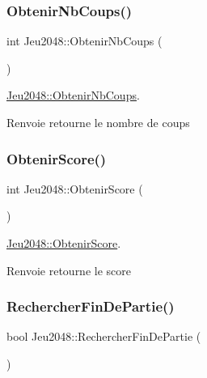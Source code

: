 \subsubsection{\texorpdfstring{Obtenir\+Nb\+Coups()}{ObtenirNbCoups()}}
{\footnotesize\ttfamily int Jeu2048\+::\+Obtenir\+Nb\+Coups (\begin{DoxyParamCaption}{ }\end{DoxyParamCaption})}



\hyperlink{class_jeu2048_a1537ec04b34f441f550de121d1e08e89}{Jeu2048\+::\+Obtenir\+Nb\+Coups}. 

\begin{DoxyReturn}{Renvoie}
retourne le nombre de coups 
\end{DoxyReturn}
\mbox{\label{class_jeu2048_a2a1383b8477b76c805f0f7d88a76820d}} 
\subsubsection{\texorpdfstring{Obtenir\+Score()}{ObtenirScore()}}
{\footnotesize\ttfamily int Jeu2048\+::\+Obtenir\+Score (\begin{DoxyParamCaption}{ }\end{DoxyParamCaption})}



\hyperlink{class_jeu2048_a2a1383b8477b76c805f0f7d88a76820d}{Jeu2048\+::\+Obtenir\+Score}. 

\begin{DoxyReturn}{Renvoie}
retourne le score 
\end{DoxyReturn}
\mbox{\label{class_jeu2048_aa894974e64fc2dd2258b81fd975cdeb3}} 
\subsubsection{\texorpdfstring{Rechercher\+Fin\+De\+Partie()}{RechercherFinDePartie()}}
{\footnotesize\ttfamily bool Jeu2048\+::\+Rechercher\+Fin\+De\+Partie (\begin{DoxyParamCaption}{ }\end{DoxyParamCaption})\hspace{0.3cm}{\ttfamily [private]}}




